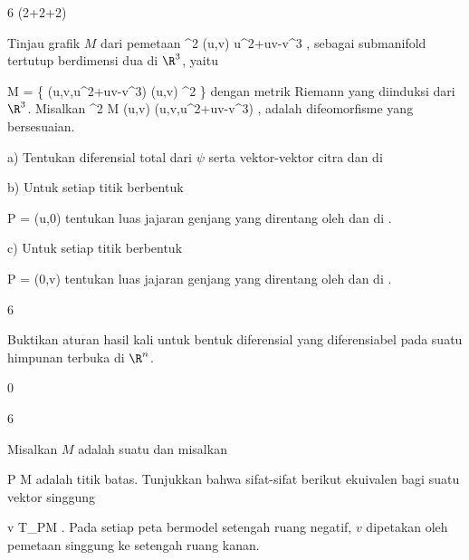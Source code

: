 {6 (2+2+2)}
{

Tinjau grafik $M$ dari pemetaan
\maabbeledisp {\varphi} {\R^2} {\R
} {(u,v)} { u^2+uv-v^3
} {,}
sebagai submanifold tertutup berdimensi dua di $\R^3$, yaitu

\mavergleichskettedisp
{\vergleichskette
{ M
}
{ =} { \left\{ (u,v,u^2+uv-v^3)  \mid  (u,v) \in \R^2         \right\}
}
{ } {
}
{ } {
}
{ } {
}
}
{}{}{}
dengan metrik Riemann yang diinduksi dari $\R^3$. Misalkan
\maabbeledisp {\psi} {\R^2} { M
} {(u,v)} { (u,v,u^2+uv-v^3)
} {,}
adalah difeomorfisme yang bersesuaian.

a) Tentukan diferensial total dari $\psi$ serta vektor-vektor citra
 dan
 di

b) Untuk setiap titik berbentuk

\mavergleichskette
{\vergleichskette
{ P
}
{ = }{ (u,0)
}
{  }{
}
{    }{
}
{   }{
}
}
{}{}{}
tentukan luas jajaran genjang yang direntang oleh
 dan
 di
.

c) Untuk setiap titik berbentuk

\mavergleichskette
{\vergleichskette
{ P
}
{ = }{ (0,v)
}
{  }{
}
{    }{
}
{   }{
}
}
{}{}{}
tentukan luas jajaran genjang yang direntang oleh
 dan
 di
.

}
{} {}

{6}
{

Buktikan aturan hasil kali untuk bentuk diferensial yang diferensiabel pada suatu himpunan terbuka di $\R^n$.

}
{} {}

{0}
{

}
{} {}

{6}
{

Misalkan $M$ adalah suatu
dan misalkan

\mavergleichskette
{\vergleichskette
{ P
}
{ \in }{ \partial M
}
{  }{
}
{    }{
}
{   }{
}
}
{}{}{}
adalah titik batas. Tunjukkan bahwa sifat-sifat berikut ekuivalen bagi suatu vektor singgung

\mavergleichskette
{\vergleichskette
{ v
}
{ \in }{ T_PM
}
{  }{
}
{    }{
}
{   }{
}
}
{}{}{.}
 { Pada setiap peta bermodel setengah ruang negatif, $v$ dipetakan oleh pemetaan singgung ke setengah ruang kanan.
}

}
{} {}

